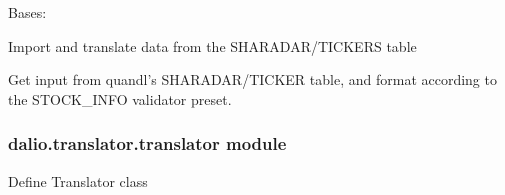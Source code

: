 \documentclass[letterpaper,10pt,english]{sphinxmanual}
\begin{document}

\begin{fulllineitems}
\label{\detokenize{dalio.translator:dalio.translator.quandl.QuandlTickerInfoTranslator}}
Bases: {\hyperref[\detokenize{dalio.translator:dalio.translator.translator.Translator}]{}}

Import and translate data from the SHARADAR/TICKERS table

\begin{fulllineitems}
\label{\detokenize{dalio.translator:dalio.translator.quandl.QuandlTickerInfoTranslator.run}}
Get input from quandl’s SHARADAR/TICKER table, and format
according to the STOCK\_INFO validator preset.

\end{fulllineitems}


\begin{fulllineitems}
\label{\detokenize{dalio.translator:dalio.translator.quandl.QuandlTickerInfoTranslator.translations}}
\end{fulllineitems}


\end{fulllineitems}



\subsubsection{dalio.translator.translator module}
\label{\detokenize{dalio.translator:module-dalio.translator.translator}}\label{\detokenize{dalio.translator:dalio-translator-translator-module}}
Define Translator class
\end{document}
